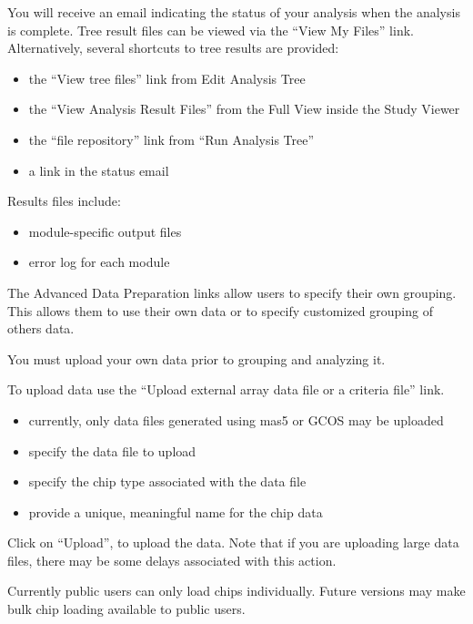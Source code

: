 \documentclass{compactslide} %
\begin{document}
\begin{slide}

You will receive an email indicating the status of your analysis when
the analysis is complete.  Tree result files can be viewed via the
``View My Files'' link.  Alternatively, several shortcuts to tree
results are provided:
\begin{itemize}
\item the ``View tree files'' link from Edit Analysis Tree
\item the ``View Analysis Result Files'' from the Full View inside the Study
  Viewer
\item the ``file repository'' link from ``Run Analysis Tree''
\item a link in the status email
\end{itemize}
Results files include:
\begin{itemize}
\item module-specific output files
\item error log for each module
\end{itemize}
\end{slide}

\begin{slide}

The Advanced Data Preparation links allow users to specify their own
grouping.  This allows them to use their own data or to specify
customized grouping of others data.

You must upload your own data prior to grouping and analyzing it.  
\end{slide}

\begin{slide}

To upload data use the  ``Upload external array data file or a criteria 
file'' link.  

\begin{itemize}
\item currently, only data files generated using mas5 or GCOS may be
    uploaded
\item specify the data file to upload
\item specify the chip type associated with the data file
\item provide a unique, meaningful name for the chip data
\end{itemize}

Click on ``Upload'', to upload the data.  Note that if you are uploading
large data files, there may be some delays associated with this action.

Currently public users can only load chips individually. Future versions
may make bulk chip loading available to public users.
\end{slide}
\end{document}
